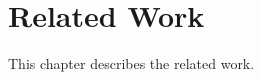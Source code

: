 \chapter{Related Work}
\label{chapter:related}

\begin{ChapAbstract}
    This chapter describes the related work.
\end{ChapAbstract}




